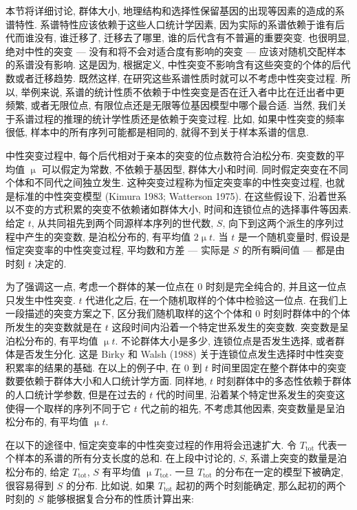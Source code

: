 \documentclass[
    12pt,%
    ]{article}
\begin{document}
本节将详细讨论, 群体大小, 地理结构和选择性保留基因的出现等因素的造成的系谱特性. 系谱特性应该依赖于这些人口统计学因素,
因为实际的系谱依赖于谁有后代而谁没有, 谁迁移了, 迁移去了哪里, 谁的后代含有不普遍的重要突变. 也很明显, 绝对中性的突变 ---
没有和将不会对适合度有影响的突变 --- 应该对随机交配样本的系谱没有影响. 这是因为, 根据定义,
中性突变不影响含有这些突变的个体的后代数或者迁移趋势. 既然这样, 在研究这些系谱性质时就可以不考虑中性突变过程.
所以, 举例来说, 系谱的统计性质不依赖于中性突变是否在迁入者中比在迁出者中更频繁, 或者无限位点,
有限位点还是无限等位基因模型中哪个最合适. 当然, 我们关于系谱过程的推理的统计学性质还是依赖于突变过程. 比如,
如果中性突变的频率很低, 样本中的所有序列可能都是相同的, 就得不到关于样本系谱的信息.

中性突变过程中, 每个后代相对于亲本的突变的位点数符合泊松分布. 突变数的平均值 $\upmu$ 可以假定为常数, 不依赖于基因型,
群体大小和时间. 同时假定突变在不同个体和不同代之间独立发生. 这种突变过程称为恒定突变率的中性突变过程,
也就是标准的中性突变模型 (Kimura 1983; Watterson 1975). 在这些假设下,
沿着世系以不变的方式积累的突变不依赖诸如群体大小, 时间和连锁位点的选择事件等因素. 给定 $t$,
从共同祖先到两个同源样本序列的世代数, $S$, 向下到这两个派生的序列过程中产生的突变数, 是泊松分布的, 有平均值 $2 \upmu
t$. 当 $t$ 是一个随机变量时, 假设是恒定突变率的中性突变过程, 平均数和方差 --- 实际是 $S$ 的所有瞬间值 --- 都是由时刻
$t$ 决定的.

为了强调这一点, 考虑一个群体的某一位点在 0 时刻是完全纯合的, 并且这一位点只发生中性突变. $t$ 代进化之后,
在一个随机取样的个体中检验这一位点. 在我们上一段描述的突变方案之下, 区分我们随机取样的这个个体和 0
时刻时群体中的个体所发生的突变数就是在 $t$ 这段时间内沿着一个特定世系发生的突变数. 突变数是呈泊松分布的, 有平均值 $\upmu
t$. 不论群体大小是多少, 连锁位点是否发生选择, 或者群体是否发生分化. 这是 Birky 和 Walsh (1988)
关于连锁位点发生选择时中性突变积累率的结果的基础. 在以上的例子中, 在 0 到 $t$
时间里固定在整个群体中的突变数要依赖于群体大小和人口统计学方面. 同样地, $t$
时刻群体中的多态性依赖于群体的人口统计学参数, 但是在过去的 $t$ 代的时间里,
沿着某个特定世系发生的突变这使得一个取样的序列不同于它 $t$ 代之前的祖先, 不考虑其他因素, 突变数量是呈泊松分布的, 有平均值
$\upmu t$.

在以下的途径中, 恒定突变率的中性突变过程的作用将会迅速扩大. 令 $T_{\text{tot}}$ 代表一个样本的系谱的所有分支长度的总和.
在上段中讨论的, $S$, 系谱上突变的数量是泊松分布的, 给定 $T_{\text{tot}}$, $S$ 有平均值 $\upmu T_{\text{tot}}$.
一旦 $T_{\text{tot}}$ 的分布在一定的模型下被确定, 很容易得到 $S$ 的分布. 比如说, 如果 $T_{\text{tot}}$
起初的两个时刻能确定, 那么起初的两个时刻的 $S$ 能够根据复合分布的性质计算出来:
\end{document}
